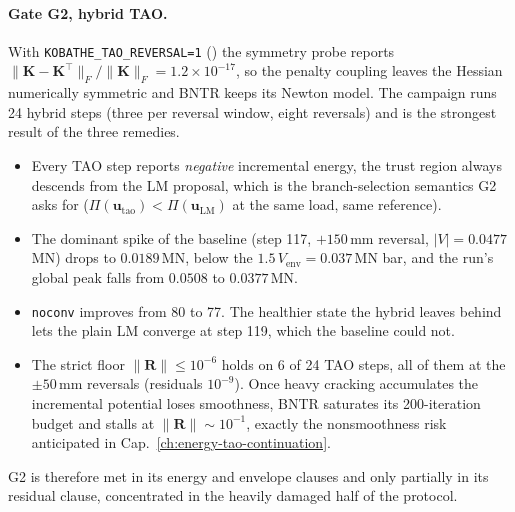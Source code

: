 \paragraph{Gate G2, hybrid TAO.}
With \texttt{KOBATHE\_TAO\_REVERSAL=1} () the
symmetry probe reports
$\lVert\mathbf K-\mathbf K^{\top}\rVert_F/\lVert\mathbf K\rVert_F =
1.2\times10^{-17}$, so the penalty coupling leaves the Hessian
numerically symmetric and BNTR keeps its Newton model. The campaign runs
24 hybrid steps (three per reversal window, eight reversals) and is the
strongest result of the three remedies.
%
\begin{itemize}
  \item Every TAO step reports \emph{negative} incremental energy, the
        trust region always descends from the LM proposal, which is the
        branch-selection semantics G2 asks for
        ($\Pi(\mathbf u_{\mathrm{tao}}) < \Pi(\mathbf u_{\mathrm{LM}})$
        at the same load, same reference).
  \item The dominant spike of the baseline (step 117, $+150$\,mm
        reversal, $|V|=0.0477$\,MN) drops to $0.0189$\,MN, below the
        $1.5\,V_{\mathrm{env}} = 0.037$\,MN bar, and the run's global
        peak falls from $0.0508$ to $0.0377$\,MN.
  \item \texttt{noconv} improves from 80 to 77. The healthier state the
        hybrid leaves behind lets the plain LM converge at step 119,
        which the baseline could not.
  \item The strict floor $\lVert\mathbf R\rVert \le 10^{-6}$ holds on
        6 of 24 TAO steps, all of them at the $\pm50$\,mm reversals
        (residuals $10^{-9}$). Once heavy cracking accumulates the
        incremental potential loses smoothness, BNTR saturates its
        200-iteration budget and stalls at
        $\lVert\mathbf R\rVert \sim 10^{-1}$, exactly the nonsmoothness
        risk anticipated in Cap.~\ref{ch:energy-tao-continuation}.
\end{itemize}
%
G2 is therefore met in its energy and envelope clauses and only
partially in its residual clause, concentrated in the heavily damaged
half of the protocol.

